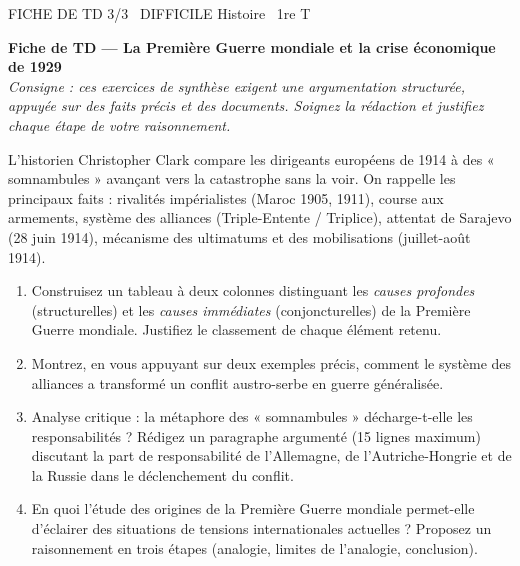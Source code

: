 \documentclass[11pt]{article}
\begin{document}
\begin{tcolorbox}[enhanced,colback=popink,colframe=popink,arc=10pt,boxrule=0pt,left=12pt,right=12pt,top=9pt,bottom=9pt]
{\color{white}\popxbold\small FICHE DE TD 3/3 \textbullet\ DIFFICILE \hfill Histoire \textbullet\ 1re T\par}
\end{tcolorbox}
\vspace{4pt}
\textbf{Fiche de TD — La Première Guerre mondiale et la crise économique de 1929}\\
\emph{Consigne : ces exercices de synthèse exigent une argumentation structurée, appuyée sur des faits précis et des documents. Soignez la rédaction et justifiez chaque étape de votre raisonnement.}

\begin{exercice}
L'historien Christopher Clark compare les dirigeants européens de 1914 à des « somnambules » avançant vers la catastrophe sans la voir. On rappelle les principaux faits : rivalités impérialistes (Maroc 1905, 1911), course aux armements, système des alliances (Triple-Entente / Triplice), attentat de Sarajevo (28 juin 1914), mécanisme des ultimatums et des mobilisations (juillet-août 1914).
\begin{enumerate}
\item Construisez un tableau à deux colonnes distinguant les \emph{causes profondes} (structurelles) et les \emph{causes immédiates} (conjoncturelles) de la Première Guerre mondiale. Justifiez le classement de chaque élément retenu.
\item Montrez, en vous appuyant sur deux exemples précis, comment le système des alliances a transformé un conflit austro-serbe en guerre généralisée.
\item Analyse critique : la métaphore des « somnambules » décharge-t-elle les responsabilités ? Rédigez un paragraphe argumenté (15 lignes maximum) discutant la part de responsabilité de l'Allemagne, de l'Autriche-Hongrie et de la Russie dans le déclenchement du conflit.
\item En quoi l'étude des origines de la Première Guerre mondiale permet-elle d'éclairer des situations de tensions internationales actuelles ? Proposez un raisonnement en trois étapes (analogie, limites de l'analogie, conclusion).
\end{enumerate}
\end{exercice}
\end{document}
